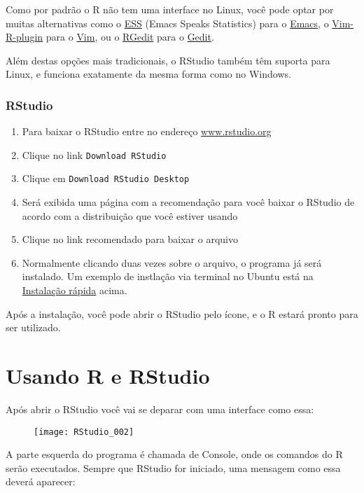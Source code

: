\documentclass[a4paper,12pt]{article}\usepackage{graphicx, color}
\providecommand{\R}{\textsf{R}\xspace}
\providecommand{\RStudio}{\textsf{RStudio}\xspace}
\begin{document}
Como por padrão o \R não tem uma interface no Linux, você pode optar por
muitas alternativas como o \href{http://ess.r-project.org}{ESS} (Emacs
Speaks Statistics) para o
\href{http://www.gnu.org/software/emacs/}{Emacs}, o
\href{http://www.lepem.ufc.br/jaa/r-plugin.html}{Vim-R-plugin} para o
\href{http://www.vim.org}{Vim}, ou o
\href{http://rgedit.sourceforge.net}{RGedit} para o
\href{http://projects.gnome.org/gedit}{Gedit}.

Além destas opções mais tradicionais, o \RStudio também têm suporta para
Linux, e funciona exatamente da mesma forma como no Windows.

\subsubsection{\RStudio}

\begin{enumerate}
\item Para baixar o \RStudio entre no endereço
  \url{www.rstudio.org}
\item Clique no link \texttt{Download RStudio}
\item Clique em \texttt{Download RStudio Desktop}
\item Será exibida uma página com a recomendação para você baixar o
  \RStudio de acordo com a distribuição que você estiver usando
\item Clique no link recomendado para baixar o arquivo
\item Normalmente clicando duas vezes sobre o arquivo, o programa já
  será instalado. Um exemplo de instlação via terminal no Ubuntu está na
  \hyperref[sec:irl]{Instalação rápida} acima.
\end{enumerate}

Após a instalação, você pode abrir o \RStudio pelo ícone, e o \R estará
pronto para ser utilizado.

\section{Usando \R e \RStudio}

Após abrir o \RStudio você vai se deparar com uma interface como essa:

\begin{figure}[H]
  \centering
  \texttt{[image: RStudio\_002]}
\end{figure}

\clearpage

A parte esquerda do programa é chamada de \textsf{Console}, onde os
comandos do \R serão executados. Sempre que \RStudio for iniciado, uma
mensagem como essa deverá aparecer:
\end{document}

